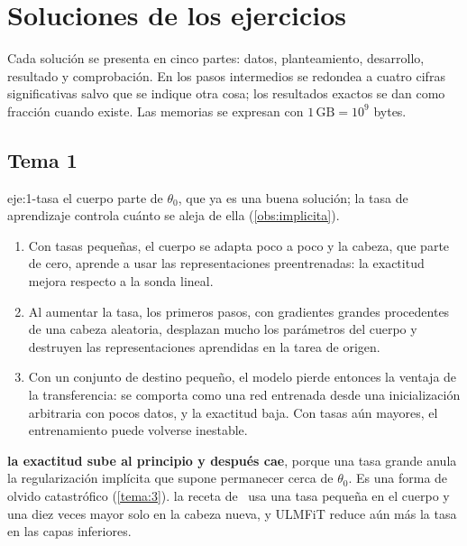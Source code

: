 \chapter{Soluciones de los ejercicios}
\label{ap:soluciones}

Cada solución se presenta en cinco partes: datos, planteamiento, desarrollo, resultado y comprobación. En los pasos intermedios se redondea a cuatro cifras significativas salvo que se indique otra cosa; los resultados exactos se dan como fracción cuando existe. Las memorias se expresan con $1\,\mathrm{GB}=10^{9}$ bytes.

\section{Tema 1}

\begin{solucion}{eje:1-tasa}
\planteamiento el cuerpo parte de $\theta_0$, que ya es una buena solución; la tasa de aprendizaje controla cuánto se aleja de ella (\cref{obs:implicita}).
\pasos
\begin{enumerate}[label=\arabic*.]
  \item Con tasas pequeñas, el cuerpo se adapta poco a poco y la cabeza, que parte de cero, aprende a usar las representaciones preentrenadas: la exactitud mejora respecto a la sonda lineal.
  \item Al aumentar la tasa, los primeros pasos, con gradientes grandes procedentes de una cabeza aleatoria, desplazan mucho los parámetros del cuerpo y destruyen las representaciones aprendidas en la tarea de origen.
  \item Con un conjunto de destino pequeño, el modelo pierde entonces la ventaja de la transferencia: se comporta como una red entrenada desde una inicialización arbitraria con pocos datos, y la exactitud baja. Con tasas aún mayores, el entrenamiento puede volverse inestable.
\end{enumerate}
\resultado \textbf{la exactitud sube al principio y después cae}, porque una tasa grande anula la regularización implícita que supone permanecer cerca de $\theta_0$. Es una forma de olvido catastrófico (\cref{tema:3}).
\comprobacion la receta de~\cite[§14.2]{d2l} usa una tasa pequeña en el cuerpo y una diez veces mayor solo en la cabeza nueva, y ULMFiT reduce aún más la tasa en las capas inferiores.
\end{solucion}

